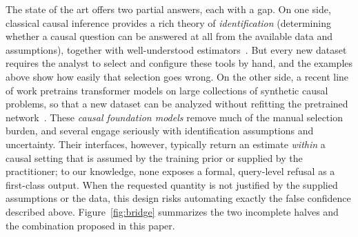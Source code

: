 \documentclass[electronics,article,submit,oneauthor]{Definitions/mdpi}
\begin{document}
The state of the art offers two partial answers, each with a gap. On one side, classical causal inference provides a rich theory of \emph{identification} (determining whether a causal question can be answered at all from the available data and assumptions), together with well-understood estimators~\cite{pearl2009causality,hernan2020whatif,hudgens2008interference}. But every new dataset requires the analyst to select and configure these tools by hand, and the examples above show how easily that selection goes wrong. On the other side, a recent line of work pretrains transformer models on large collections of synthetic causal problems, so that a new dataset can be analyzed without refitting the pretrained network~\cite{ma2025causalfm,robertson2025dopfn,thompson2026arrow,qiao2026cdfm}. These \emph{causal foundation models} remove much of the manual selection burden, and several engage seriously with identification assumptions and uncertainty. Their interfaces, however, typically return an estimate \emph{within} a causal setting that is assumed by the training prior or supplied by the practitioner; to our knowledge, none exposes a formal, query-level refusal as a first-class output. When the requested quantity is not justified by the supplied assumptions or the data, this design risks automating exactly the false confidence described above. Figure~\ref{fig:bridge} summarizes the two incomplete halves and the combination proposed in this paper.
\end{document}
